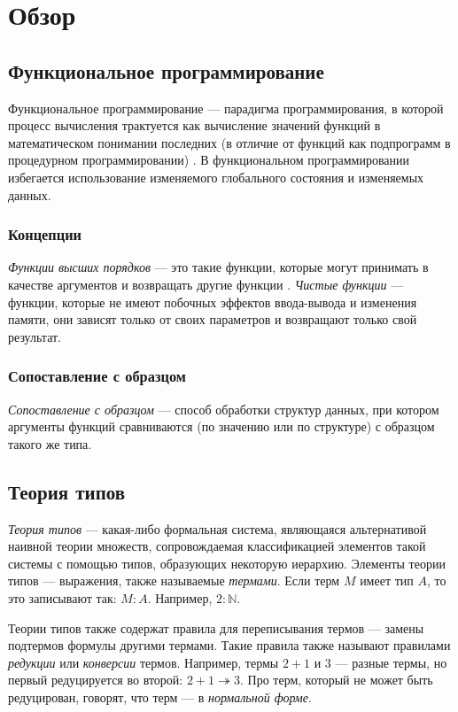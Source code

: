\chapter{Обзор
}
\label{chapter1}

\section{Функциональное программирование}
Функциональное программирование — парадигма программирования, 
в которой процесс вычисления трактуется как вычисление значений функций в математическом понимании последних (в отличие от функций как подпрограмм в процедурном программировании) \cite{wikiFP}.
В функциональном программировании избегается использование изменяемого глобального состояния и изменяемых данных.
\subsection{Концепции}
\emph{Функции высших порядков} — это такие функции, которые могут принимать
в качестве аргументов и возвращать другие функции \cite{SICP}.
\emph{Чистые функции} — функции, которые не имеют побочных эффектов
ввода-вывода и изменения памяти,
они зависят только от своих параметров и возвращают только свой результат.
\subsection{Сопоставление с образцом}
\emph{Сопоставление с образцом} — способ обработки структур данных,
при котором аргументы функций сравниваются (по значению или по структуре)
с образцом такого же типа.
\section{Теория типов}
\emph{Теория типов} — какая-либо формальная система, являющаяся альтернативой
наивной теории множеств, сопровождаемая классификацией элементов такой системы
с помощью типов, образующих некоторую иерархию.
Элементы теории типов — выражения, также называемые \emph{термами}.
Если терм $ M $ имеет тип $A$, то это записывают так: $ M : A $.
Например, $ 2 : \mathbb{N} $.

Теории типов также содержат правила для переписывания термов — замены
подтермов формулы другими термами.
Такие правила также называют правилами \emph{редукции}
или \emph{конверсии} термов.
Например, термы $2 + 1$ и $3$ — разные термы, но первый редуцируется во второй:
$2 + 1 \twoheadrightarrow 3$.
Про терм, который не может быть редуцирован, говорят,
что терм — в \emph{нормальной форме}.
